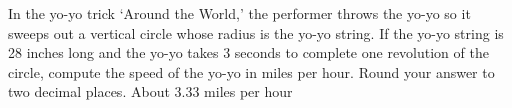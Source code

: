 {\label{yoyotrick} In the yo-yo trick `Around the World,' the performer throws the yo-yo so it sweeps out a vertical circle whose radius is the yo-yo string. If the yo-yo string is 28 inches long and the yo-yo takes 3 seconds to complete one revolution of the circle, compute the speed of the yo-yo in miles per hour.  Round your answer to two decimal places.}
{About 3.33 miles per hour}